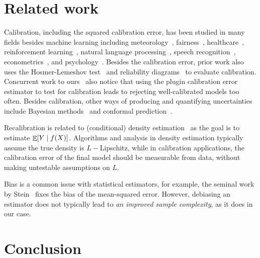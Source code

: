 \section{Related work}

Calibration, including the squared calibration error, has been studied in many fields besides machine learning including meteorology~\cite{murphy1973vector, murphy1977reliability, degroot1983forecasters,gneiting2005weather, brocker2009decomposition}, fairness~\cite{johnson2018multicalibration, liu2019implicit}, healthcare~\cite{jiang2012calibrating, crowson2017calibration, harrell1996prognostic, yadlowsky2019calibration}, reinforcement learning~\cite{malik2019calibrated}, natural language processing~\cite{nguyen2015posterior, card2018calibration}, speech recognition~\cite{dong2011calibration}, econometrics~\cite{gneiting2007probabilistic}, and psychology~\cite{lichtenstein1982calibration}.
Besides the calibration error, prior work also uses the Hosmer-Lemeshov test~\cite{hosmer1980goodness} and reliability diagrams~\cite{degroot1983forecasters, brocker2007reliability} to evaluate calibration.
Concurrent work to ours~\cite{widmann2019calibration} also notice that using the plugin calibration error estimator to test for calibration leads to rejecting well-calibrated models too often.
Besides calibration, other ways of producing and quantifying uncertainties include Bayesian methods~\cite{gelman1995bayesian} and conformal prediction~\cite{shafer2008tutorial, lei2016distribution}.

Recalibration is related to (conditional) density estimation~\cite{wasserman2019, parzen1962} as the goal is to estimate $\mathop{\mathbb{E}}[Y \mid f(X)]$. Algorithms and analysis in density estimation typically assume the true density is $L-$Lipschitz, while in calibration applications, the calibration error of the final model should be measurable from data, without making untestable assumptions on $L$.

Bias is a common issue with statistical estimators, for example, the seminal work by Stein~\cite{stein81sure} fixes the bias of the mean-squared error. However, debiasing an estimator does not typically lead to \emph{an improved sample complexity}, as it does in our case.

\section{Conclusion}

